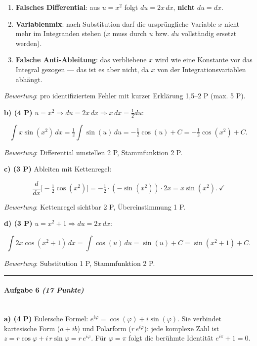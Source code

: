 \documentclass[11pt, a4paper]{article}
\begin{document}
\begin{enumerate}
  \item \textbf{Falsches Differential}: aus $u=x^2$ folgt $du = 2x\,dx$, \textbf{nicht} $du=dx$.
  \item \textbf{Variablenmix}: nach Substitution darf die ursprüngliche Variable $x$ nicht mehr im Integranden stehen ($x$ muss durch $u$ bzw. $du$ vollständig ersetzt werden).
  \item \textbf{Falsche Anti-Ableitung}: das verbliebene $x$ wird wie eine Konstante vor das Integral gezogen — das ist es aber nicht, da $x$ von der Integrationsvariablen abhängt.
\end{enumerate}
\textit{Bewertung}: pro identifiziertem Fehler mit kurzer Erklärung 1,5–2 P (max. 5 P).


\textbf{b) (4 P)} $u=x^2 \Rightarrow du = 2x\,dx \Rightarrow x\,dx = \tfrac{1}{2}du$:

\[
\int x\sin(x^2)\,dx = \tfrac{1}{2}\int \sin(u)\,du = -\tfrac{1}{2}\cos(u)+C = -\tfrac{1}{2}\cos(x^2)+C.
\]

\textit{Bewertung}: Differential umstellen 2 P, Stammfunktion 2 P.


\textbf{c) (3 P)} Ableiten mit Kettenregel:

\[
\frac{d}{dx}\Big[-\tfrac{1}{2}\cos(x^2)\Big] = -\tfrac{1}{2}\cdot(-\sin(x^2))\cdot 2x = x\sin(x^2).\ \checkmark
\]

\textit{Bewertung}: Kettenregel sichtbar 2 P, Übereinstimmung 1 P.


\textbf{d) (3 P)} $u=x^2+1 \Rightarrow du=2x\,dx$:

\[
\int 2x\cos(x^2+1)\,dx = \int \cos(u)\,du = \sin(u)+C = \sin(x^2+1)+C.
\]

\textit{Bewertung}: Substitution 1 P, Stammfunktion 2 P.



\noindent\textcolor{rulegray}{\rule{\linewidth}{0.4pt}}


\paragraph{Aufgabe 6 \textit{(17 Punkte)}}\mbox{}\\[2pt]

\textbf{a) (4 P)} Eulersche Formel: $e^{i\varphi} = \cos(\varphi)+i\sin(\varphi)$. Sie verbindet kartesische Form ($a+ib$) und Polarform ($r\,e^{i\varphi}$): jede komplexe Zahl ist $z = r\cos\varphi + i\,r\sin\varphi = r\,e^{i\varphi}$. Für $\varphi=\pi$ folgt die berühmte Identität $e^{i\pi}+1=0$.
\end{document}
